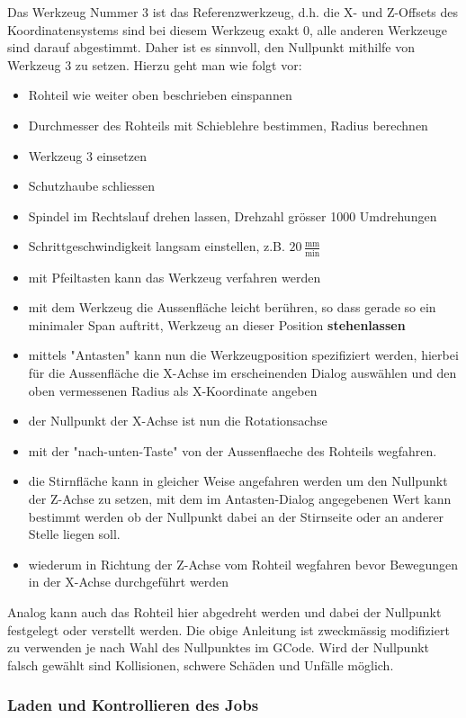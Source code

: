 \documentclass{\basedir/fablab-document}
\begin{document}
Das Werkzeug Nummer 3 ist das Referenzwerkzeug, d.h. die X- und Z-Offsets des Koordinatensystems sind bei diesem Werkzeug exakt $0$, alle anderen Werkzeuge sind darauf abgestimmt. Daher ist es sinnvoll, den Nullpunkt mithilfe von Werkzeug 3 zu setzen. Hierzu geht man wie folgt vor:
\begin{itemize}
	\item Rohteil wie weiter oben beschrieben einspannen
	\item Durchmesser des Rohteils mit Schieblehre bestimmen, Radius berechnen
	\item Werkzeug 3 einsetzen
	\item Schutzhaube schliessen
	\item Spindel im Rechtslauf drehen lassen, Drehzahl grösser 1000 Umdrehungen
	\item Schrittgeschwindigkeit langsam einstellen, z.B. $20\,\frac{\mathrm{mm}}{\mathrm{min}}$
	\item mit Pfeiltasten kann das Werkzeug verfahren werden
	\item mit dem Werkzeug die Aussenfläche leicht berühren, so dass gerade so ein minimaler Span auftritt, Werkzeug an dieser Position \textbf{stehenlassen}
	\item mittels "Antasten" kann nun die Werkzeugposition spezifiziert werden, hierbei für die Aussenfläche die X-Achse im erscheinenden Dialog auswählen und den oben vermessenen Radius als X-Koordinate angeben
	\item der Nullpunkt der X-Achse ist nun die Rotationsachse
	\item mit der "nach-unten-Taste" von der Aussenflaeche des Rohteils wegfahren.
	\item die Stirnfläche kann in gleicher Weise angefahren werden um den Nullpunkt der Z-Achse zu setzen, mit dem im Antasten-Dialog angegebenen Wert kann bestimmt werden ob der Nullpunkt dabei an der Stirnseite oder an anderer Stelle liegen soll.
	\item wiederum in Richtung der Z-Achse vom Rohteil wegfahren bevor Bewegungen in der X-Achse durchgeführt werden
\end{itemize}

Analog kann auch das Rohteil hier abgedreht werden und dabei der Nullpunkt festgelegt oder verstellt werden. Die obige Anleitung ist zweckmässig modifiziert zu verwenden je nach Wahl des Nullpunktes im GCode. Wird der Nullpunkt falsch gewählt sind Kollisionen, schwere Schäden und Unfälle möglich.

\subsubsection{Laden und Kontrollieren des Jobs}
\end{document}

